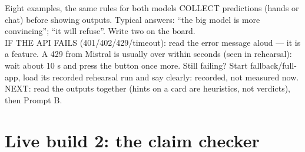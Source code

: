 \begin{frame}{Eight examples, the same rules for both models}
{COLLECT predictions (hands or chat) before showing outputs. Typical answers: ``the big model is more
convincing''; ``it will refuse''. Write two on the board.\\
IF THE API FAILS (401/402/429/timeout): read the error message aloud --- it is a feature. A 429 from Mistral
is usually over within seconds (seen in rehearsal): wait about 10 s and press the button once more. Still
failing? Start fallback/full-app, load its recorded rehearsal run and say clearly: recorded, not measured now.\\
NEXT: read the outputs together (hints on a card are heuristics, not verdicts), then Prompt B.}
\end{frame}


\section[Build 2: checker]{Live build 2: the claim checker}

